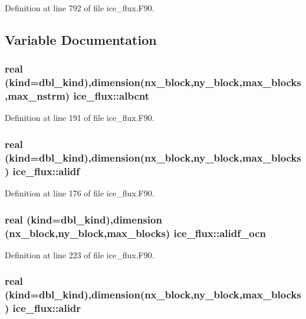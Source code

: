 Definition at line 792 of file ice\_\-flux.F90.

\subsection{Variable Documentation}
\hypertarget{namespaceice__flux_a43a0dd63e5a473c4acb725f534c3192d}{
\subsubsection[{albcnt}]{\setlength{\rightskip}{0pt plus 5cm}real (kind=dbl\_\-kind),dimension(nx\_\-block,ny\_\-block,max\_\-blocks,max\_\-nstrm) {\bf ice\_\-flux::albcnt}}}
\label{namespaceice__flux_a43a0dd63e5a473c4acb725f534c3192d}


Definition at line 191 of file ice\_\-flux.F90.\hypertarget{namespaceice__flux_a18a9ac0e0bdd270272fbdc48beab2c8e}{
\subsubsection[{alidf}]{\setlength{\rightskip}{0pt plus 5cm}real (kind=dbl\_\-kind),dimension(nx\_\-block,ny\_\-block,max\_\-blocks) {\bf ice\_\-flux::alidf}}}
\label{namespaceice__flux_a18a9ac0e0bdd270272fbdc48beab2c8e}


Definition at line 176 of file ice\_\-flux.F90.\hypertarget{namespaceice__flux_a9d1893a1b54339b70d7119c4c03163c8}{
\subsubsection[{alidf\_\-ocn}]{\setlength{\rightskip}{0pt plus 5cm}real (kind=dbl\_\-kind),dimension (nx\_\-block,ny\_\-block,max\_\-blocks) {\bf ice\_\-flux::alidf\_\-ocn}}}
\label{namespaceice__flux_a9d1893a1b54339b70d7119c4c03163c8}


Definition at line 223 of file ice\_\-flux.F90.\hypertarget{namespaceice__flux_a43c7f22f8888770c074c9affc70d5a6b}{
\subsubsection[{alidr}]{\setlength{\rightskip}{0pt plus 5cm}real (kind=dbl\_\-kind),dimension(nx\_\-block,ny\_\-block,max\_\-blocks) {\bf ice\_\-flux::alidr}}}
\label{namespaceice__flux_a43c7f22f8888770c074c9affc70d5a6b}


